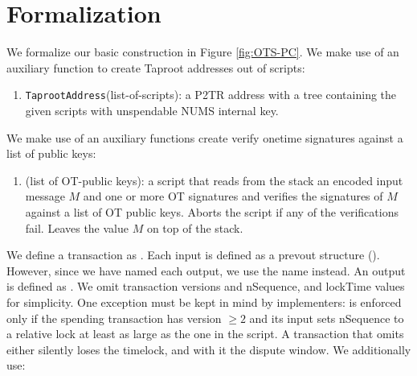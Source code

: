 \section{Formalization}
\label{formalization}

We formalize our basic construction in Figure \ref{fig:OTS-PC}. We make use of an auxiliary function to create Taproot addresses out of scripts:

\begin{enumerate}
    \item \texttt{TaprootAddress}(list-of-scripts): a P2TR address with a tree containing the given scripts with unspendable NUMS internal key.
    
\end{enumerate}

We make use of an auxiliary functions create verify onetime signatures against a list of public keys: 
\begin{enumerate}  
    \item \texttt{}(list of OT-public keys): a script that reads from the stack an encoded input message $M$ and one or more OT signatures and verifies the signatures of $M$ against a list of OT public keys. Aborts the script if any of the verifications fail. Leaves the value $M$ on top of the stack. 
\end{enumerate}


We define a transaction as . 
Each input is defined as a prevout structure (). However, since we have named each output, we use the name instead. An output is defined as .
We omit transaction versions and nSequence, and lockTime values for simplicity. One exception must be kept in mind by implementers:  is enforced only if the spending transaction has version $\geq 2$ and its input sets nSequence to a relative lock at least as large as the one in the script. A transaction that omits either silently loses the timelock, and with it the dispute window. We additionally use:

